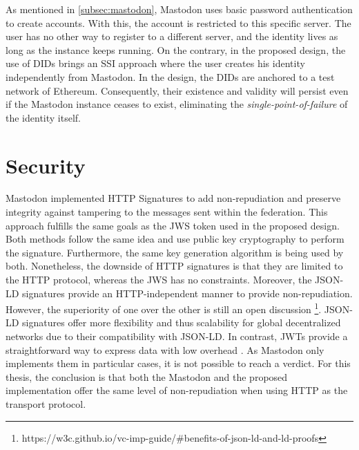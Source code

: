 As mentioned in \ref{subsec:mastodon}, Mastodon uses basic password authentication to create accounts. With this, the account is restricted to this specific server. The user has no other way to register to a different server, and the identity lives as long as the instance keeps running. On the contrary, in the proposed design, the use of DIDs brings an SSI approach where the user creates his identity independently from Mastodon. In the design, the DIDs are anchored to a test network of Ethereum. Consequently, their existence and validity will persist even if the Mastodon instance ceases to exist, eliminating the \emph{single-point-of-failure} of the identity itself.  

\section{Security}
Mastodon implemented HTTP Signatures to add non-repudiation and preserve integrity against tampering to the messages sent within the federation. This approach fulfills the same goals as the JWS token used in the proposed design. Both methods follow the same idea and use public key cryptography to perform the signature. Furthermore, the same key generation algorithm is being used by both. Nonetheless, the downside of HTTP signatures is that they are limited to the HTTP protocol, whereas the JWS has no constraints. 
Moreover, the JSON-LD signatures provide an HTTP-independent manner to provide non-repudiation. However, the superiority of one over the other is still an open discussion \footnote{https://w3c.github.io/vc-imp-guide/\#benefits-of-json-ld-and-ld-proofs}. JSON-LD signatures offer more flexibility and thus scalability for global decentralized networks due to their compatibility with JSON-LD. In contrast, JWTs provide a straightforward way to express data with low overhead \cite{chadwick_longley_sporny_terbu_zagidulin_zundel_2022}. As Mastodon only implements them in particular cases, it is not possible to reach a verdict. 
For this thesis, the conclusion is that both the Mastodon and the proposed implementation offer the same level of non-repudiation when using HTTP as the transport protocol. 

